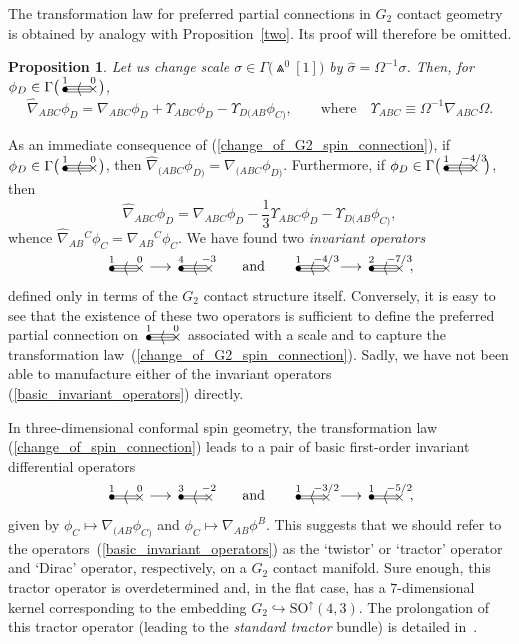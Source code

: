 \documentclass[pdftex]{sigma}%
\numberwithin{equation}{section}
\newtheorem{prop}[Theorem]{Proposition}
 { \theoremstyle{definition}
\newtheorem{Definition}[Theorem]{Definition}
\newtheorem{Note}[Theorem]{Note}
\newtheorem{Example}[Theorem]{Example}
\newtheorem{Remark}[Theorem]{Remark} }
\newcommand{\btwo}[2]{\begin{picture}(28,11)
\put(4,1.5){\makebox(0,0){$\bullet$}}
\put(24,1.5){\makebox(0,0){$\times$}}
\put(23,2.5){\line(-1,0){20}}
\put(23,0.5){\line(-1,0){20}}
\put(14,1.5){\makebox(0,0){$\langle$}}
\put(4,8){\makebox(0,0){$\scriptstyle #1$}}
\put(24,8){\makebox(0,0){$\scriptstyle #2$}}
\end{picture}}
\newcommand{\gtwo}[2]{\begin{picture}(28,10)
\put(4,1.1){\makebox(0,0){$\bullet$}}
\put(24,1.5){\makebox(0,0){$\times$}}
\put(4,3.5){\line(1,0){18}}
\put(4,1.5){\line(1,0){20}}
\put(4,-.5){\line(1,0){18}}
\put(14,1.5){\makebox(0,0){$\langle$}}
\put(4,8){\makebox(0,0){$\scriptstyle #1$}}
\put(24,8){\makebox(0,0){$\scriptstyle #2$}}
\end{picture}}
\begin{document}
The transformation law for preferred partial connections in $G_2$ contact
geometry is obtained by analogy with Proposition~\ref{two}. Its proof will
therefore be omitted.
\begin{prop} Let us change scale $\sigma\in\Gamma\big({\Wedge}^0[1]\big)$ by
$\widehat\sigma=\Omega^{-1}\sigma$. Then, for $\phi_D\in\Gamma\big(\gtwo{1}{0}\big)$,
\begin{equation}\label{change_of_G2_spin_connection}
\widehat\nabla_{ABC}\phi_D=\nabla_{ABC}\phi_D+\Upsilon_{ABC}\phi_D
-\Upsilon_{D(AB}\phi_{C)},\qquad\mbox{where} \quad
\Upsilon_{ABC}\equiv\Omega^{-1}\nabla_{ABC}\Omega.\end{equation}
\end{prop}
As an immediate consequence of (\ref{change_of_G2_spin_connection}), if
$\phi_D\in\Gamma\big(\gtwo{1}{0}\big)$, then
$\widehat\nabla_{(ABC}\phi_{D)}=\nabla_{(ABC}\phi_{D)}$. Furthermore, if
$\phi_D\in\Gamma\big(\gtwo{1}{-4/3}\ \big)$, then
\[\textstyle\widehat\nabla_{ABC}\phi_D
=\nabla_{ABC}\phi_D-\frac13\Upsilon_{ABC}\phi_D-\Upsilon_{D(AB}\phi_{C)},\]
whence $\widehat\nabla_{AB}{}^C\phi_C=\nabla_{AB}{}^C\phi_C$. We have found
two {\em invariant operators}
\begin{equation}\label{basic_invariant_operators}
\gtwo{1}{0}\longrightarrow\gtwo{4}{-3}\qquad\mbox{and}\qquad
\gtwo{1}{-4/3}\;\longrightarrow\gtwo{2}{-7/3}\ ,\end{equation}
defined only in terms of the $G_2$ contact structure itself. Conversely, it is
easy to see that the existence of these two operators is sufficient to define
the preferred partial connection on $\gtwo{1}{0}$ associated with a scale and
to capture the transformation law~(\ref{change_of_G2_spin_connection}).
Sadly, we have not been able to manufacture either of the invariant operators
(\ref{basic_invariant_operators}) directly.

In three-dimensional conformal spin geometry, the transformation law
(\ref{change_of_spin_connection}) leads to a pair of basic first-order
invariant differential operators
\[\btwo{1}{0}\longrightarrow\btwo{3}{-2}\qquad\mbox{and}\qquad
\btwo{1}{-3/2}\;\longrightarrow\btwo{1}{-5/2}\ ,\]
given by $\phi_C\mapsto\nabla_{(AB}\phi_{C)}$ and
$\phi_C\mapsto\nabla_{AB}\phi^B$. This suggests that we should refer to the
opera\-tors~(\ref{basic_invariant_operators}) as the `twistor' or `tractor'
operator and `Dirac' operator, respectively, on a $G_2$ contact manifold. Sure
enough, this tractor operator is overdetermined and, in the flat case, has a
$7$-dimensional kernel corresponding to the embedding
$G_2\hookrightarrow{\mathrm{SO}}^\uparrow(4,3)$. The prolongation of this
tractor operator (leading to the {\em standard tractor} bundle) is detailed
in~\cite{Moy}.
\end{document}
